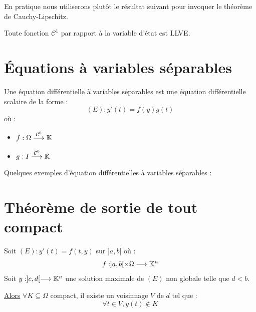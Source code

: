 En pratique nous utiliserons plutôt le résultat suivant pour invoquer le théorème de Cauchy-Lipschitz. 

\begin{proposition}
    Toute fonction $ \mathcal{C}^1$ par rapport à la variable d'état est LLVE. 
\end{proposition}



\newpage

\section{Équations à variables séparables}

\begin{definition}
    Une équation différentielle à variables séparables est une équation différentielle scalaire de la forme : 
        \[ (E) : y'(t) = f(y)g(t) \] 
    où : 
    \begin{itemize}
        \item $f : \Omega \overset{ \mathcal{C}^0}{\longrightarrow} \mathbb{K} $
        \item $g : I \overset{ \mathcal{C}^0}{\longrightarrow} \mathbb{K} $ 
    \end{itemize}
\end{definition}

\begin{example}
    Quelques exemples d'équation différentielles à variables séparables : 

\end{example}



\section{Théorème de sortie de tout compact}

\begin{theorem}
    Soit $(E) : y'(t) = f(t,y)$ sur $]a,b[$ où : 
        \[ f : ]a,b[ \times \Omega \longrightarrow \mathbb{K}^n \] 
    Soit $y : ]c,d[ \longrightarrow \mathbb{K}^n$ une solution maximale de $(E)$ non globale telle que $d < b$. 

    \underline{Alors} $ \forall K \subseteq \Omega$ compact, il existe un voisinnage $V$ de $d$ tel que : 
        \[ \forall t \in V, y(t) \not \in K \] 
\end{theorem}

